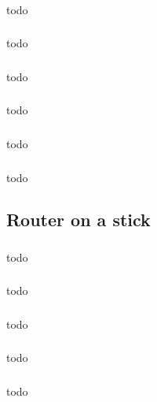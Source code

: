 \documentclass[a4paper, 12pt]{article}
\begin{document}
		\subsubsection{}
			todo

		\subsubsection{}
			todo

		\subsubsection{}
			todo

		\subsubsection{}
			todo

		\subsubsection{}
			todo

		\subsubsection{}
			todo

	\subsection{Router on a stick}

		\subsubsection{}
			todo

		\subsubsection{}
			todo

		\subsubsection{}
			todo

		\subsubsection{}
			todo

		\subsubsection{}
			todo
\end{document}
